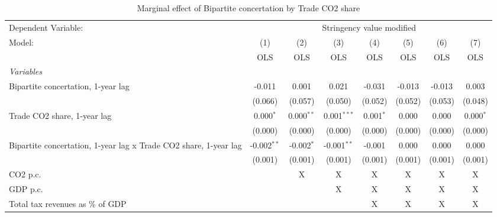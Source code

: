
\begin{table}[htbp]
   \caption{Marginal effect of Bipartite concertation by Trade CO2 share}
   \centering
   \begin{tabular}{lccccccc}
      \toprule
      Dependent Variable: & \multicolumn{7}{c}{Stringency value modified}\\
      Model:                                                           & (1)           & (2)          & (3)           & (4)         & (5)     & (6)     & (7)\\  
                                                                       &  OLS          & OLS          & OLS           & OLS         & OLS     & OLS     & OLS\\  
      \midrule
      \emph{Variables}\\
      Bipartite concertation, 1-year lag                               & -0.011        & 0.001        & 0.021         & -0.031      & -0.013  & -0.013  & 0.003\\   
                                                                       & (0.066)       & (0.057)      & (0.050)       & (0.052)     & (0.052) & (0.053) & (0.048)\\   
      Trade CO2 share, 1-year lag                                      & 0.000$^{*}$   & 0.000$^{**}$ & 0.001$^{***}$ & 0.001$^{*}$ & 0.000   & 0.000   & 0.000$^{*}$\\   
                                                                       & (0.000)       & (0.000)      & (0.000)       & (0.000)     & (0.000) & (0.000) & (0.000)\\   
      Bipartite concertation, 1-year lag x Trade CO2 share, 1-year lag & -0.002$^{**}$ & -0.002$^{*}$ & -0.001$^{**}$ & -0.001      & 0.000   & 0.000   & 0.000\\   
                                                                       & (0.001)       & (0.001)      & (0.001)       & (0.001)     & (0.001) & (0.001) & (0.001)\\   
      CO2 p.c.                                                         &               & X            & X             & X           & X       & X       & X\\  
      GDP p.c.                                                         &               &              & X             & X           & X       & X       & X\\  
      Total tax revenues as \% of GDP                                  &               &              &               & X           & X       & X       & X\\  

\end{tabular}
\end{table}
